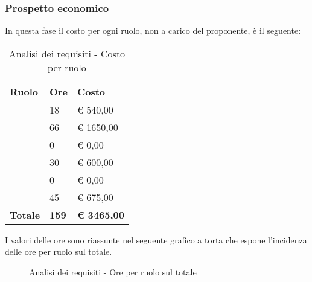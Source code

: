 		\subsubsection{Prospetto economico} %
		\label{ssub:prospetto_economico}
		In questa fase il costo per ogni ruolo, non a carico del proponente, è il seguente: \\
			\begin{table}[!ht]
				\begin{center}
					\begin{tabularx}{0.65\textwidth}{|l|l|X|}
						\hline
						\textbf{Ruolo} & \textbf{Ore} & \textbf{Costo} \\
						\hline
						\roleProjectManager & 18 & \euro{} 540,00 \\
						\hline
						\roleAnalyst & 66 & \euro{} 1650,00 \\
						\hline
						\roleDesigner & 0 & \euro{} 0,00 \\
						\hline
						\roleAdministrator & 30 & \euro{} 600,00 \\
						\hline
						\roleProgrammer & 0 & \euro{} 0,00 \\
						\hline
						\roleVerifier & 45 & \euro{} 675,00 \\
						\hline
						\textbf{Totale} & \textbf{159} & \textbf{\euro{} 3465,00} \\
						\hline
					\end{tabularx}
				\end{center}
			\caption{Analisi dei requisiti - Costo per ruolo}
			\end{table}
			
			\noindent
			I valori delle ore sono riassunte nel seguente grafico a torta che espone l’incidenza delle ore per ruolo sul totale.
			\begin{center}
				\begin{figure}[htbp]
				\vspace{0.8cm}
				\caption{Analisi dei requisiti - Ore per ruolo sul totale}
				\end{figure}
			\end{center}

